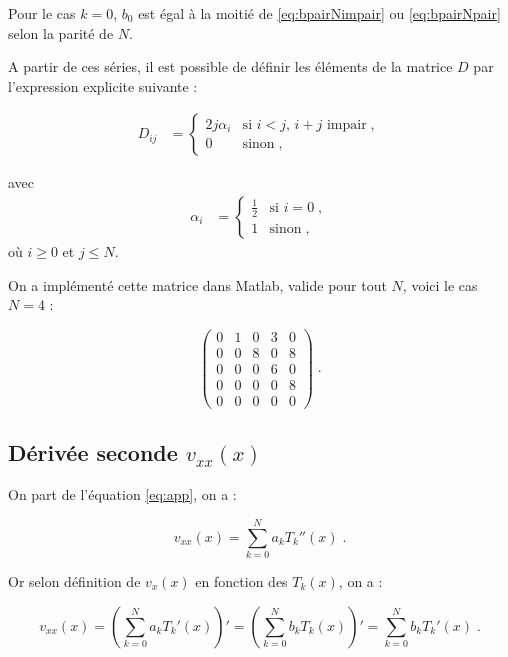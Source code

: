 \documentclass{report}
\begin{document}
Pour le cas $k=0$, $b_{0}$ est égal à la moitié de \eqref{eq:bpairNimpair} ou \eqref{eq:bpairNpair} selon la parité de $N$.

A partir de ces séries, il est possible de définir les éléments de la matrice $D$ par l'expression explicite suivante :

\begin{align}
D_{ij} &= 
  \begin{cases}
    2j\alpha_{i} & \text{si $i<j$, $i+j$ impair}\;, \\
0 & \text{sinon}\;,
  \end{cases}
  \end{align}
  
  avec 
  \begin{align}
\alpha_{i} &= 
  \begin{cases}
    \frac{1}{2} & \text{si $i =0$}\;, \\
1 & \text{sinon}\;,
  \end{cases}
  \end{align}
où $i\geq 0$ et $j \leq N$.



On a implémenté cette matrice dans Matlab, valide pour tout $N$, voici le cas $N=4$ :

\begin{equation}
\begin{pmatrix}
0 & 1 & 0 & 3 & 0\\ 
0 & 0 & 8 & 0 & 8\\ 
0 & 0 & 0 & 6 & 0\\ 
0 & 0 & 0 & 0 & 8\\ 
0 & 0 & 0 & 0 & 0
\end{pmatrix} \;.
\end{equation}

\subsection*{Dérivée seconde $v_{xx}(x)$}

On part de l'équation \eqref{eq:app}, on a :

\begin{equation}
v_{xx}(x) = \sum_{k=0}^N a_k T_{k}''(x)\;.\label{eq:vxxa}
\end{equation}

Or selon définition de $v_{x}(x)$ en fonction des $T_{k}(x)$, on a :

\begin{equation}
v_{xx}(x) = \left(\sum_{k=0}^N a_k T_{k}'(x)\right)' = \left(\sum_{k=0}^N b_k T_k(x)\right)' = \sum_{k=0}^N b_k T_{k}'(x) \;.
\end{equation}
\end{document}
